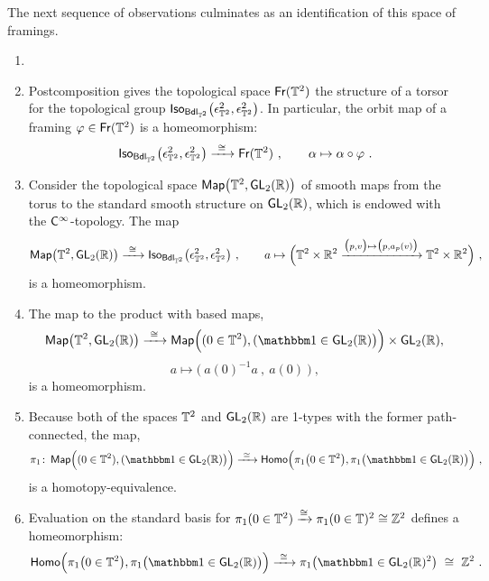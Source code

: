 The next sequence of observations culminates as an identification of this space of framings.
\begin{observation}
\label{t20}


\begin{enumerate}
\item[~]


\item
Postcomposition gives the topological space $\operatorname{\sf Fr}(\mathbb T^2)$ the structure of a torsor for the topological group $\operatorname{\sf Iso}_{\operatorname{\sf Bdl}_{\mathbb T^2}}\bigl( \epsilon^2_{\mathbb T^2} , \epsilon^2_{\mathbb T^2} \bigr)$.
In particular, the orbit map of a framing $\varphi \in \operatorname{\sf Fr}(\mathbb T^2)$ is a homeomorphism:
\begin{equation}
\label{e41}
\operatorname{\sf Iso}_{\operatorname{\sf Bdl}_{\mathbb T^2}}\bigl( \epsilon^2_{\mathbb T^2} , \epsilon^2_{\mathbb T^2} \bigr)
\xrightarrow{~\cong~}
\operatorname{\sf Fr}(\mathbb T^2)
~,\qquad
\alpha \mapsto 
\alpha \circ \varphi 
~.
\end{equation}


\item
Consider the topological space $\operatorname{{\sf Map}} \bigl( \mathbb T^2 , \operatorname{\sf GL}_2(\mathbb R) \bigr)$ of smooth maps from the torus to the standard smooth structure on $\operatorname{\sf GL}_2(\mathbb R)$, which is endowed with the $\mathsf C^\infty$-topology. 
The map
\begin{equation}
\label{e43}
\operatorname{{\sf Map}} \bigl( \mathbb T^2 , \operatorname{\sf GL}_2(\mathbb R) \bigr)
\xrightarrow{~\cong~}
\operatorname{\sf Iso}_{\operatorname{\sf Bdl}_{\mathbb T^2}}\bigl( \epsilon^2_{\mathbb T^2} , \epsilon^2_{\mathbb T^2} \bigr)
~,\qquad
a
\mapsto 
\Bigl(
\mathbb T^2\times \mathbb R^2
\xrightarrow{\bigl( p,v \bigr) \mapsto \bigl( p,a_p(v) \bigr) }
\mathbb T^2 \times \mathbb R^2
\Bigr)
~,
\end{equation}
is a homeomorphism.

\item
The map to the product with based maps,
\begin{equation}
\label{e44}
\Map \bigl( \TT^2 , \GL_2(\RR) \bigr)
\xra{~\cong~}
\Map\Bigl( ( 0\in \TT^2) , ( \uno \in \GL_2(\RR) \bigr) \Bigr)
\times
\GL_2(\RR),
\end{equation}
\[
a
\mapsto 
\bigl(
~
a(0)^{-1} a~ ,~ a(0)
~
\bigr)
~,
\]
is a homeomorphism.


\item
Because both of the spaces $\mathbb T^2$ and $\operatorname{\sf GL}_2(\mathbb R)$ are 1-types with the former path-connected, 
the map,
\[
\pi_1
\colon
\Map\Bigl( ( 0\in \TT^2) , ( \uno \in \GL_2(\RR) \bigr) \Bigr)
\xra{~\simeq~}
{\sf Homo}\Bigl( \pi_1\bigl( 0 \in \TT^2 \bigr) , \pi_1\bigl( \uno \in \GL_2(\RR) \bigr) \Bigr) 
~,
\]
is a homotopy-equivalence.

\item
Evaluation on the standard basis for $\pi_1(0\in \mathbb T^2) \xrightarrow{\cong} \pi_1(0\in \mathbb T)^2 \cong \mathbb Z^2$ defines a homeomorphism:
\begin{equation}
\label{e45}
{\sf Homo}\Bigl( \pi_1\bigl( 0 \in \TT^2 \bigr) , \pi_1\bigl( \uno \in \GL_2(\RR) \bigr) \Bigr) 
\xra{~\cong~}
\pi_1\bigl( \uno \in \GL_2(\RR)^2 \bigr)
~\cong~
\ZZ^2
~.
\end{equation}

\end{enumerate}

\end{observation}




